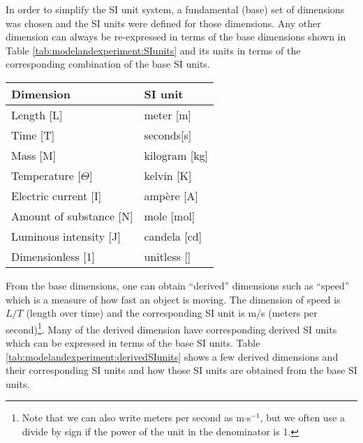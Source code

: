 In order to simplify the SI unit system, a fundamental (base) set of dimensions was chosen and the SI units were defined for those dimensions. Any other dimension can always be re-expressed in terms of the base dimensions shown in Table \ref{tab:modelandexperiment:SIunits} and its units in terms of the corresponding combination of the base SI units.

\begin{center}
\begin{tabular}{ll }
\textbf{Dimension}&\textbf{SI unit}\\
\hline
\hline
Length [L]& meter [m]\\ \hline
Time [T]& seconds[s] \\ \hline
Mass [M]& kilogram [kg]\\ \hline
Temperature [$\Theta$]& kelvin [K] \\ \hline
Electric current [I]& amp\`ere [A]\\ \hline
Amount of substance [N]& mole [mol] \\ \hline
Luminous intensity [J]& candela [cd] \\ \hline
Dimensionless [1]& unitless [] \\ \hline
\end{tabular}
\end{center}

From the base dimensions, one can obtain ``derived'' dimensions such as ``speed'' which is a measure of how fast an object is moving. The dimension of speed is $L/T$ (length over time) and the corresponding SI unit is m/s (meters per second)\footnote{Note that we can also write meters per second as m$\cdot$s$^{-1}$, but we often use a divide by sign if the power of the unit in the denominator is 1.}. Many of the derived dimension have corresponding derived SI units which can be expressed in terms of the base SI units. Table \ref{tab:modelandexperiment:derivedSIunits} shows a few derived dimensions and their corresponding SI units and how those SI units are obtained from the base SI units.

